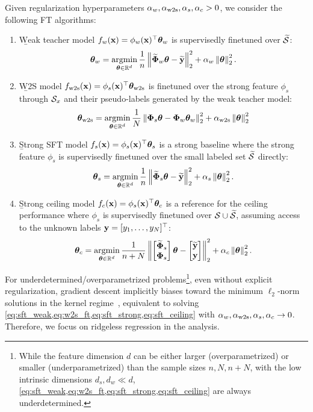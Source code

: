 Given regularization hyperparameters $\alpha_w, \alpha_{\mathrm{w2s}}, \alpha_s, \alpha_c > 0$, we consider the following FT algorithms: 
\begin{enumerate}[label=(\alph*)]
    \item \b{Weak teacher model} $f_w(\mathbf{x}) = \phi_w(\mathbf{x})^\top \boldsymbol{\theta}_w$ is supervisedly finetuned over $\widetilde{{\mathcal{S}}}$: 
    \begin{align}\label{eq:sft_weak}
        \boldsymbol{\theta}_w = \mathop{\mathrm{argmin}}_{\boldsymbol{\theta} \in \mathbb{R}^d} \frac{1}{n}\left\|\widetilde{\boldsymbol{\Phi}}_w \boldsymbol{\theta} - \widetilde{\mathbf{y}}\right\|_2^2 + \alpha_w \left\|\boldsymbol{\theta}\right\|_2^2.
    \end{align}
    \item \b{W2S model} $f_{\mathrm{w2s}}(\mathbf{x}) = \phi_s(\mathbf{x})^\top \boldsymbol{\theta}_{\mathrm{w2s}}$ is finetuned over the strong feature $\phi_s$ through ${\mathcal{S}}_x$ and their pseudo-labels generated by the weak teacher model:
    \begin{align}\label{eq:w2s_ft}
        \boldsymbol{\theta}_{\mathrm{w2s}} = \mathop{\mathrm{argmin}}_{\boldsymbol{\theta} \in \mathbb{R}^d} \frac{1}{N}\left\|\boldsymbol{\Phi}_s \boldsymbol{\theta} - \boldsymbol{\Phi}_w \boldsymbol{\theta}_w\right\|_2^2 + \alpha_{\mathrm{w2s}} \left\|\boldsymbol{\theta}\right\|_2^2
    \end{align}
    \item \b{Strong SFT model} $f_s(\mathbf{x}) = \phi_s(\mathbf{x})^\top \boldsymbol{\theta}_s$ is a strong baseline where the strong feature $\phi_s$ is supervisedly finetuned over the small labeled set $\widetilde{{\mathcal{S}}}$ directly:
    \begin{align}\label{eq:sft_strong}
        \boldsymbol{\theta}_s = \mathop{\mathrm{argmin}}_{\boldsymbol{\theta} \in \mathbb{R}^d} \frac{1}{n}\left\|\widetilde{\boldsymbol{\Phi}}_s \boldsymbol{\theta} - \widetilde{\mathbf{y}}\right\|_2^2 + \alpha_s \left\|\boldsymbol{\theta}\right\|_2^2.
    \end{align}

    \item \b{Strong ceiling model} $f_c(\mathbf{x}) = \phi_s(\mathbf{x})^\top \boldsymbol{\theta}_c$ is a reference for the ceiling performance where $\phi_s$ is supervisedly finetuned over ${\mathcal{S}} \cup \widetilde{{\mathcal{S}}}$, assuming access to the unknown labels $\mathbf{y} = [y_1, \ldots, y_N]^\top$:
    \begin{align}\label{eq:sft_ceiling}
        \boldsymbol{\theta}_c = \mathop{\mathrm{argmin}}_{\boldsymbol{\theta} \in \mathbb{R}^d} \frac{1}{n+N}\left\|\begin{bmatrix} \widetilde{\boldsymbol{\Phi}}_s \\ \boldsymbol{\Phi}_s \end{bmatrix} \boldsymbol{\theta} - \begin{bmatrix} \widetilde{\mathbf{y}} \\ \mathbf{y} \end{bmatrix}\right\|_2^2 + \alpha_c \left\|\boldsymbol{\theta}\right\|_2^2.
    \end{align}
\end{enumerate}
For underdetermined/overparametrized problems\footnote{
    While the feature dimension $d$ can be either larger (overparametrized) or smaller (underparametrized) than the sample sizes $n, N, n+N$, with the low intrinsic dimensions $d_s, d_w \ll d$, \cref{eq:sft_weak,eq:w2s_ft,eq:sft_strong,eq:sft_ceiling} are always underdetermined.
}, {even without explicit regularization, gradient descent implicitly biases toward the minimum $\ell_2$-norm solutions in the kernel regime~\citep{woodworth2020kernel}, equivalent to solving \cref{eq:sft_weak,eq:w2s_ft,eq:sft_strong,eq:sft_ceiling} with $\alpha_w, \alpha_{\mathrm{w2s}}, \alpha_s, \alpha_c \to 0$. Therefore, we focus on ridgeless regression in the analysis.}



